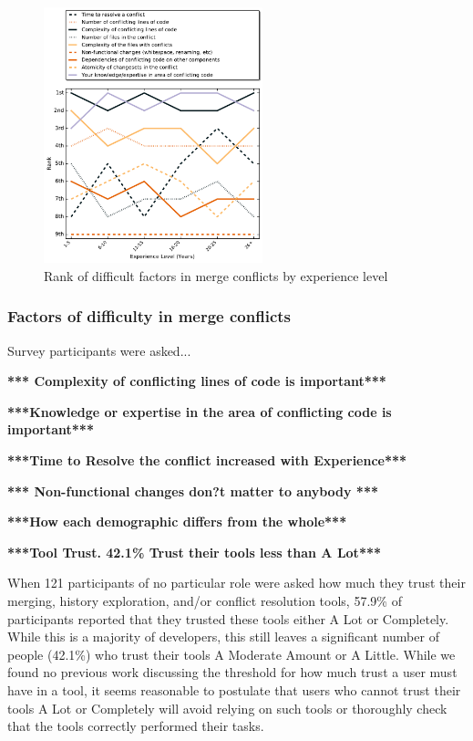 \documentclass[conference]{IEEEtran}
\begin{document}
\begin{figure}[!t]
\centering
\includegraphics[width=2.5in]{ExpVsRankConDiff.pdf}
\caption{Rank of difficult factors in merge conflicts by experience level}
\label{con_diff_rank}
\end{figure}

\subsubsection{Factors of difficulty in merge conflicts}
Survey participants were asked...

\textbf{*** Complexity of conflicting lines of code is important***}

\textbf{***Knowledge or expertise in the area of conflicting code is important***}

\textbf{***Time to Resolve the conflict increased with Experience***}

\textbf{*** Non-functional changes don?t matter to anybody ***}

\textbf{***How each demographic differs from the whole***}

\textbf{***Tool Trust. 42.1\% Trust their tools less than A Lot***}

When 121 participants of no particular role were asked how much they trust their merging, history exploration, and/or conflict resolution tools, 57.9\% of participants reported that they trusted these tools either A Lot or Completely. While this is a majority of developers, this still leaves a significant number of people (42.1\%) who trust their tools A Moderate Amount or A Little. While we found no previous work discussing the threshold for how much trust a user must have in a tool, it seems reasonable to postulate that users who cannot trust their tools A Lot or Completely will avoid relying on such tools or thoroughly check that the tools correctly performed their tasks. 
\end{document}
